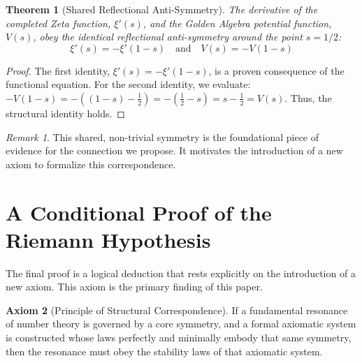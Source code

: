 \documentclass{article}
\theoremstyle{plain}
\newtheorem{theorem}{Theorem}[section]
\theoremstyle{definition}
\newtheorem{axiom}[theorem]{Axiom}
\theoremstyle{remark}
\newtheorem*{remark}{Remark}
\begin{document}
\begin{theorem}[Shared Reflectional Anti-Symmetry]
The derivative of the completed Zeta function, $\xi'(s)$, and the Golden Algebra potential function, $V(s)$, obey the identical reflectional anti-symmetry around the point $s=1/2$:
$$ \xi'(s) = -\xi'(1-s) \quad \text{and} \quad V(s) = -V(1-s) $$
\end{theorem}
\begin{proof}
The first identity, $\xi'(s) = -\xi'(1-s)$, is a proven consequence of the functional equation. For the second identity, we evaluate: $-V(1-s) = - \left( (1-s) - \frac{1}{2} \right) = - \left( \frac{1}{2} - s \right) = s - \frac{1}{2} = V(s)$. Thus, the structural identity holds.
\end{proof}

\begin{remark}
This shared, non-trivial symmetry is the foundational piece of evidence for the connection we propose. It motivates the introduction of a new axiom to formalize this correspondence.
\end{remark}


\section{A Conditional Proof of the Riemann Hypothesis}
The final proof is a logical deduction that rests explicitly on the introduction of a new axiom. This axiom is the primary finding of this paper.

\begin{axiom}[Principle of Structural Correspondence]
If a fundamental resonance of number theory is governed by a core symmetry, and a formal axiomatic system is constructed whose laws perfectly and minimally embody that same symmetry, then the resonance must obey the stability laws of that axiomatic system.
\end{axiom}
\end{document}
